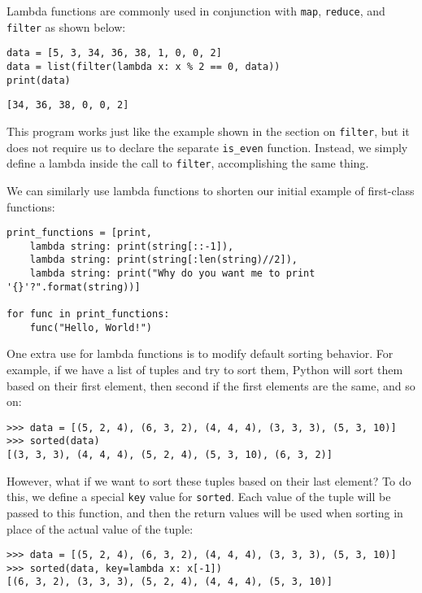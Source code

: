 \documentclass[11pt]{cselabheader}
\begin{document}
Lambda functions are commonly used in conjunction with \lstinline{map}, \lstinline{reduce}, and \lstinline{filter} as shown below:

\begin{lstlisting}[style=python]
data = [5, 3, 34, 36, 38, 1, 0, 0, 2]
data = list(filter(lambda x: x % 2 == 0, data))
print(data)
\end{lstlisting}

\begin{lstlisting}[style=bash]
[34, 36, 38, 0, 0, 2]
\end{lstlisting}

This program works just like the example shown in the section on \lstinline{filter}, but it does not require us to declare the separate \lstinline{is_even} function. Instead, we simply define a lambda inside the call to \lstinline{filter}, accomplishing the same thing.

We can similarly use lambda functions to shorten our initial example of first-class functions:

\begin{lstlisting}[style=python]
print_functions = [print,
    lambda string: print(string[::-1]),
    lambda string: print(string[:len(string)//2]),
    lambda string: print("Why do you want me to print '{}'?".format(string))]

for func in print_functions:
    func("Hello, World!")
\end{lstlisting}

One extra use for lambda functions is to modify default sorting behavior. For example, if we have a list of tuples and try to sort them, Python will sort them based on their first element, then second if the first elements are the same, and so on:

\begin{lstlisting}[style=ipython]
>>> data = [(5, 2, 4), (6, 3, 2), (4, 4, 4), (3, 3, 3), (5, 3, 10)]
>>> sorted(data)
[(3, 3, 3), (4, 4, 4), (5, 2, 4), (5, 3, 10), (6, 3, 2)]
\end{lstlisting}

However, what if we want to sort these tuples based on their last element? To do this, we define a special \lstinline{key} value for \lstinline{sorted}. Each value of the tuple will be passed to this function, and then the return values will be used when sorting in place of the actual value of the tuple:

\begin{lstlisting}[style=ipython]
>>> data = [(5, 2, 4), (6, 3, 2), (4, 4, 4), (3, 3, 3), (5, 3, 10)]
>>> sorted(data, key=lambda x: x[-1])
[(6, 3, 2), (3, 3, 3), (5, 2, 4), (4, 4, 4), (5, 3, 10)]
\end{lstlisting}
\end{document}
